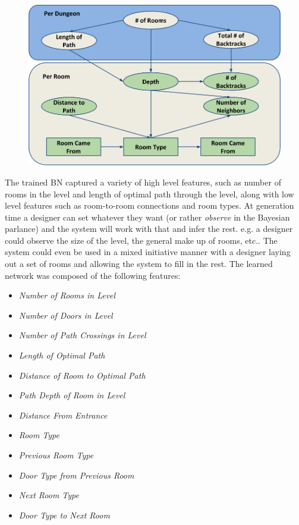 \documentclass[12pt]{report}
\begin{document}
\begin{figure}[ht]
\centering
  \includegraphics[width=1\linewidth]{figures/The_Learning_of_Zelda.png}
  \caption{}
  \label{fig:BN}
\end{figure}
The trained BN captured a variety of high level features, such as number of rooms in the level and length of optimal path through the level, along with low level features such as room-to-room connections and room types.    At generation time a designer can set whatever they want (or rather \textit{observe} in the Bayesian parlance) and the system will work with that and infer the rest.  e.g. a designer could observe the size of the level, the general make up of rooms, etc..  The system could even be used in a mixed initiative manner with a designer laying out a set of rooms and allowing the system to fill in the rest.  The learned network was composed of the following features:
\begin{itemize}
\item \textit{Number of Rooms in Level}
\item \textit{Number of Doors in Level}
\item \textit{Number of Path Crossings in Level}
\item \textit{Length of Optimal Path}
\item \textit{Distance of Room to Optimal Path}
\item \textit{Path Depth of Room in Level}
\item \textit{Distance From Entrance}
\item \textit{Room Type}
\item \textit{Previous Room Type}
\item \textit{Door Type from Previous Room}
\item \textit{Next Room Type}
\item \textit{Door Type to Next Room}
\end{itemize}
\end{document}
